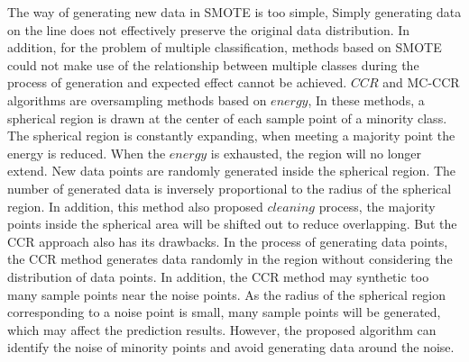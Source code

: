 \documentclass[runningheads]{llncs}
\begin{document}
The way of generating new data in SMOTE is too simple, 
Simply generating data on the line does not effectively preserve the original data distribution\cite{2017CCR,2020Combined}.
In addition, for the problem of multiple classification, 
methods based on SMOTE could not make use of the relationship between multiple classes during the process of 
generation and expected effect cannot be achieved.
$CCR$ and MC-CCR algorithms are oversampling methods based on $energy$,
In these methods, a spherical region is drawn at the center of each sample point of a minority class. 
The spherical region is constantly expanding, when meeting a majority point the energy is reduced.
When the $energy$ is exhausted, the region will no longer extend.
New data points are randomly generated inside the spherical region. 
The number of generated data is inversely proportional to the radius of the spherical region.
In addition, this method also proposed $cleaning$ process, 
the majority points inside the spherical area will be shifted out to reduce overlapping.
But the CCR approach also has its drawbacks. In the process of generating data points,
the CCR method generates data randomly in the region without considering the distribution of data points.
In addition, the CCR method may synthetic too many sample points near the noise points. 
As the radius of the spherical region corresponding 
to a noise point is small, many sample points will be generated, which may affect the prediction results.
However, the proposed algorithm can identify the noise of minority points and 
avoid generating data around the noise.
\end{document}
